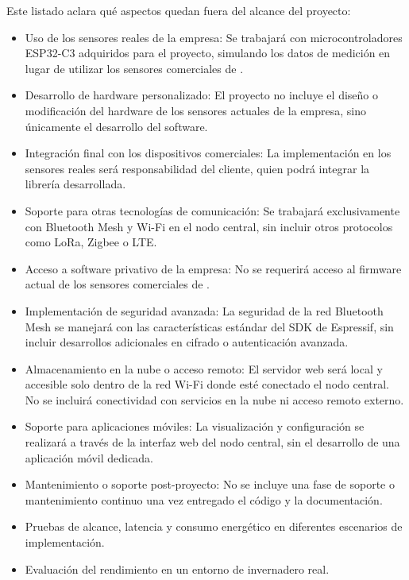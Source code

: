 \documentclass[
11pt, %
]{charter}
\begin{document}
{\begin{itemize}
\end{itemize}



Este listado aclara qué aspectos quedan fuera del alcance del proyecto:

\begin{itemize}
\item Uso de los sensores reales de la empresa: Se trabajará con microcontroladores ESP32-C3 adquiridos para el proyecto, simulando los datos de medición en lugar de utilizar los sensores comerciales de {\empclientename}.
\item Desarrollo de hardware personalizado: El proyecto no incluye el diseño o modificación del hardware de los sensores actuales de la empresa, sino únicamente el desarrollo del software.
\item Integración final con los dispositivos comerciales: La implementación en los sensores reales será responsabilidad del cliente, quien podrá integrar la librería desarrollada.
\item Soporte para otras tecnologías de comunicación: Se trabajará exclusivamente con Bluetooth Mesh y Wi-Fi en el nodo central, sin incluir otros protocolos como LoRa, Zigbee o LTE.
\item Acceso a software privativo de la empresa: No se requerirá acceso al firmware actual de los sensores comerciales de {\empclientename}.
\item Implementación de seguridad avanzada: La seguridad de la red Bluetooth Mesh se manejará con las características estándar del SDK de Espressif, sin incluir desarrollos adicionales en cifrado o autenticación avanzada.
\item Almacenamiento en la nube o acceso remoto: El servidor web será local y accesible solo dentro de la red Wi-Fi donde esté conectado el nodo central. No se incluirá conectividad con servicios en la nube ni acceso remoto externo.
\item Soporte para aplicaciones móviles: La visualización y configuración se realizará a través de la interfaz web del nodo central, sin el desarrollo de una aplicación móvil dedicada.
\item Mantenimiento o soporte post-proyecto: No se incluye una fase de soporte o mantenimiento continuo una vez entregado el código y la documentación.
\item Pruebas de alcance, latencia y consumo energético en diferentes escenarios de implementación.
\item Evaluación del rendimiento en un entorno de invernadero real.
\end{itemize}

}
\end{document}
